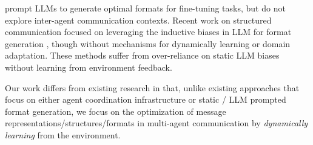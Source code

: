 \cite{yuan2023structured} prompt LLMs to generate optimal formats for fine-tuning tasks, but do not explore inter-agent communication contexts.
Recent work on structured communication focused on leveraging the inductive biases in LLM for format generation \cite{chen2022program}, though without mechanisms for dynamically learning or domain adaptation. These methods suffer from over-reliance on static LLM biases without learning from environment feedback.

Our work differs from existing research in that, unlike existing approaches that focus on either agent coordination infrastructure or static / LLM prompted format generation, we focus on the optimization of message representations/structures/formats in multi-agent communication by \emph{dynamically learning} from the environment.

